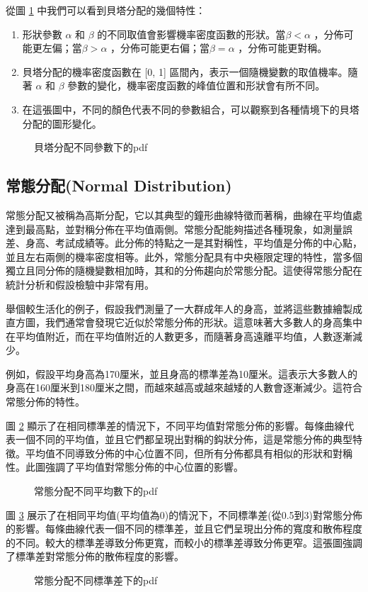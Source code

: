 從圖 \ref{fig:beta-distribution_a,b_pdf} 中我們可以看到貝塔分配的幾個特性：
\begin{enumerate}
\item 形狀參數 $\alpha$ 和 $\beta$ 的不同取值會影響機率密度函數的形狀。當$\beta <\alpha$ ，分佈可能更左偏；當$\beta >\alpha$ ，分佈可能更右偏；當$\beta =\alpha$ ，分佈可能更對稱。
\item 貝塔分配的機率密度函數在 [0, 1] 區間內，表示一個隨機變數的取值機率。隨著 $\alpha$ 和 $\beta$ 參數的變化，機率密度函數的峰值位置和形狀會有所不同。
\item 在這張圖中，不同的顏色代表不同的參數組合，可以觀察到各種情境下的貝塔分配的圖形變化。
\end{enumerate}
\begin{figure}[h]
    \caption{貝塔分配不同參數下的pdf}
    \label{fig:beta-distribution_a,b_pdf}
\end{figure}
\subsection{常態分配(Normal Distribution)}
常態分配又被稱為高斯分配，它以其典型的鐘形曲線特徵而著稱，曲線在平均值處達到最高點，並對稱分佈在平均值兩側。常態分配能夠描述各種現象，如測量誤差、身高、考試成績等。此分佈的特點之一是其對稱性，平均值是分佈的中心點，並且左右兩側的機率密度相等。此外，常態分配具有中央極限定理的特性，當多個獨立且同分佈的隨機變數相加時，其和的分佈趨向於常態分配。這使得常態分配在統計分析和假設檢驗中非常有用。

舉個較生活化的例子，假設我們測量了一大群成年人的身高，並將這些數據繪製成直方圖，我們通常會發現它近似於常態分佈的形狀。這意味著大多數人的身高集中在平均值附近，而在平均值附近的人數更多，而隨著身高遠離平均值，人數逐漸減少。

例如，假設平均身高為170厘米，並且身高的標準差為10厘米。這表示大多數人的身高在160厘米到180厘米之間，而越來越高或越來越矮的人數會逐漸減少。這符合常態分佈的特性。

圖 \ref{fig:normal-distribution_mean} 顯示了在相同標準差的情況下，不同平均值對常態分佈的影響。每條曲線代表一個不同的平均值，並且它們都呈現出對稱的鈎狀分佈，這是常態分佈的典型特徵。平均值不同導致分佈的中心位置不同，但所有分佈都具有相似的形狀和對稱性。此圖強調了平均值對常態分佈的中心位置的影響。
\begin{figure}[h]
    \caption{常態分配不同平均數下的pdf}
    \label{fig:normal-distribution_mean}
\end{figure}
圖 \ref{fig:normal-distribution_std} 展示了在相同平均值(平均值為0)的情況下，不同標準差(從0.5到3)對常態分佈的影響。每條曲線代表一個不同的標準差，並且它們呈現出分佈的寬度和散佈程度的不同。較大的標準差導致分佈更寬，而較小的標準差導致分佈更窄。這張圖強調了標準差對常態分佈的散佈程度的影響。
\begin{figure}[h]
    \caption{常態分配不同標準差下的pdf}
    \label{fig:normal-distribution_std}
\end{figure}
